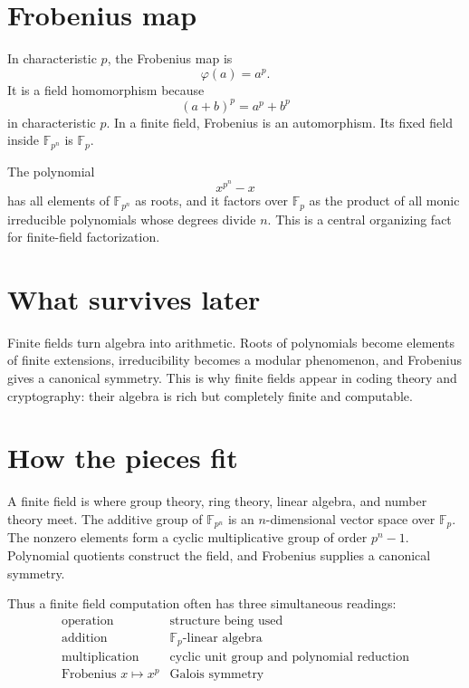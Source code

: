 \section{Frobenius map}

In characteristic \(p\), the Frobenius map is
\[
  \varphi(a)=a^p.
\]
It is a field homomorphism because
\[
  (a+b)^p=a^p+b^p
\]
in characteristic \(p\).  In a finite field, Frobenius is an automorphism.  Its fixed field inside \(\mathbb F_{p^n}\) is \(\mathbb F_p\).

The polynomial
\[
  x^{p^n}-x
\]
has all elements of \(\mathbb F_{p^n}\) as roots, and it factors over \(\mathbb F_p\) as the product of all monic irreducible polynomials whose degrees divide \(n\).  This is a central organizing fact for finite-field factorization.

\section{What survives later}

Finite fields turn algebra into arithmetic.  Roots of polynomials become elements of finite extensions, irreducibility becomes a modular phenomenon, and Frobenius gives a canonical symmetry.  This is why finite fields appear in coding theory and cryptography: their algebra is rich but completely finite and computable.

\section{How the pieces fit}

A finite field is where group theory, ring theory, linear algebra, and number theory meet.  The additive group of \(\mathbb F_{p^n}\) is an \(n\)-dimensional vector space over \(\mathbb F_p\).  The nonzero elements form a cyclic multiplicative group of order \(p^n-1\).  Polynomial quotients construct the field, and Frobenius supplies a canonical symmetry.

Thus a finite field computation often has three simultaneous readings:
\[
\begin{array}{c|c}
\text{operation} & \text{structure being used}\\
\hline
\text{addition} & \mathbb F_p\text{-linear algebra}\\
\text{multiplication} & \text{cyclic unit group and polynomial reduction}\\
\text{Frobenius }x\mapsto x^p & \text{Galois symmetry}
\end{array}
\]

